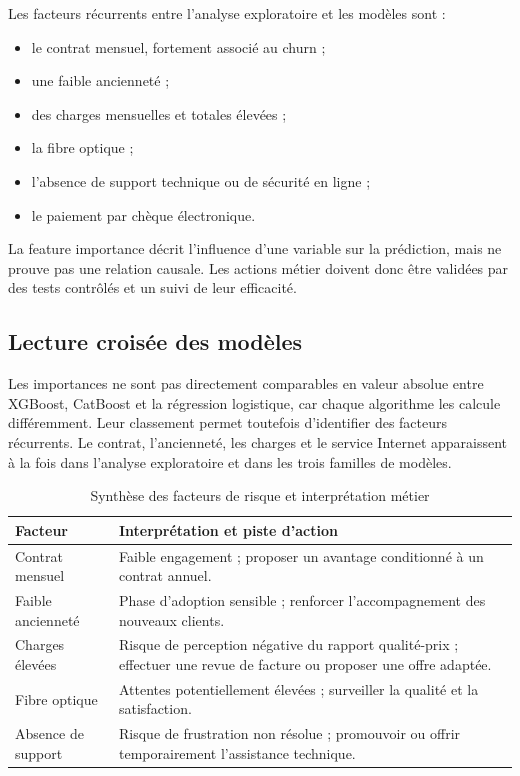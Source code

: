 \documentclass[12pt, a4paper]{article}
\begin{document}
Les facteurs récurrents entre l'analyse exploratoire et les modèles sont :
\begin{itemize}[leftmargin=*]
    \item le contrat mensuel, fortement associé au churn ;
    \item une faible ancienneté ;
    \item des charges mensuelles et totales élevées ;
    \item la fibre optique ;
    \item l'absence de support technique ou de sécurité en ligne ;
    \item le paiement par chèque électronique.
\end{itemize}

\begin{warningbox}
La feature importance décrit l'influence d'une variable sur la prédiction, mais
ne prouve pas une relation causale. Les actions métier doivent donc être
validées par des tests contrôlés et un suivi de leur efficacité.
\end{warningbox}

\subsection{Lecture croisée des modèles}

Les importances ne sont pas directement comparables en valeur absolue entre
XGBoost, CatBoost et la régression logistique, car chaque algorithme les calcule
différemment. Leur classement permet toutefois d'identifier des facteurs
récurrents. Le contrat, l'ancienneté, les charges et le service Internet
apparaissent à la fois dans l'analyse exploratoire et dans les trois familles
de modèles.

\begin{table}[H]
\centering
\caption{Synthèse des facteurs de risque et interprétation métier}
\begin{tabularx}{\textwidth}{p{}X}
\toprule
\textbf{Facteur} & \textbf{Interprétation et piste d'action}\\
\midrule
Contrat mensuel &
Faible engagement ; proposer un avantage conditionné à un contrat annuel.\\
Faible ancienneté &
Phase d'adoption sensible ; renforcer l'accompagnement des nouveaux clients.\\
Charges élevées &
Risque de perception négative du rapport qualité-prix ; effectuer une revue
de facture ou proposer une offre adaptée.\\
Fibre optique &
Attentes potentiellement élevées ; surveiller la qualité et la satisfaction.\\
Absence de support &
Risque de frustration non résolue ; promouvoir ou offrir temporairement
l'assistance technique.\\
\bottomrule
\end{tabularx}
\end{table}
\end{document}
